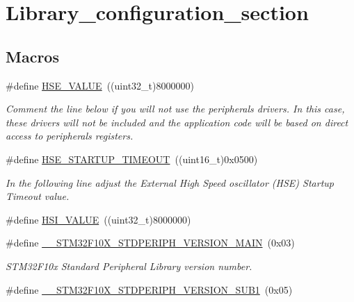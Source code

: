 \hypertarget{group___library__configuration__section}{\section{Library\-\_\-configuration\-\_\-section}
\label{group___library__configuration__section}
}
\subsection*{Macros}
\begin{DoxyCompactItemize}
\item 
\#define \hyperlink{group___library__configuration__section_gaeafcff4f57440c60e64812dddd13e7cb}{H\-S\-E\-\_\-\-V\-A\-L\-U\-E}~((uint32\-\_\-t)8000000)
\begin{DoxyCompactList}\small\item\em Comment the line below if you will not use the peripherals drivers. In this case, these drivers will not be included and the application code will be based on direct access to peripherals registers. \end{DoxyCompactList}\item 
\#define \hyperlink{group___library__configuration__section_ga68ecbc9b0a1a40a1ec9d18d5e9747c4f}{H\-S\-E\-\_\-\-S\-T\-A\-R\-T\-U\-P\-\_\-\-T\-I\-M\-E\-O\-U\-T}~((uint16\-\_\-t)0x0500)
\begin{DoxyCompactList}\small\item\em In the following line adjust the External High Speed oscillator (H\-S\-E) Startup Timeout value. \end{DoxyCompactList}\item 
\#define \hyperlink{group___library__configuration__section_gaaa8c76e274d0f6dd2cefb5d0b17fbc37}{H\-S\-I\-\_\-\-V\-A\-L\-U\-E}~((uint32\-\_\-t)8000000)
\item 
\#define \hyperlink{group___library__configuration__section_ga4c236abf68876febcb304f05ed3bafac}{\-\_\-\-\_\-\-S\-T\-M32\-F10\-X\-\_\-\-S\-T\-D\-P\-E\-R\-I\-P\-H\-\_\-\-V\-E\-R\-S\-I\-O\-N\-\_\-\-M\-A\-I\-N}~(0x03)
\begin{DoxyCompactList}\small\item\em S\-T\-M32\-F10x Standard Peripheral Library version number. \end{DoxyCompactList}\item 
\#define \hyperlink{group___library__configuration__section_ga7ce69a7c755b9d0551e9755d28612cb0}{\-\_\-\-\_\-\-S\-T\-M32\-F10\-X\-\_\-\-S\-T\-D\-P\-E\-R\-I\-P\-H\-\_\-\-V\-E\-R\-S\-I\-O\-N\-\_\-\-S\-U\-B1}~(0x05)

\end{DoxyCompactItemize}
